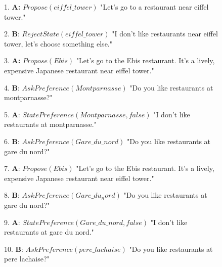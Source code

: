 	\begin{figure}[!t]
	\begin{minipage}{\textwidth}
			{\ttfamily
				\begin{addmargin}[1em]{2em}%
					\vspace{0.5 em}
					1. \textbf{A:} $Propose(eiffel\_tower)$ "Let's go to a restaurant \hspace*{3mm} near eiffel tower."
					
					
					2. \hspace*{3mm}\textbf{B}: $RejectState(eiffel\_tower)$ "I don't like \hspace*{4mm} restaurants near eiffel tower, let's choose \hspace*{4mm} something else."
					
					
					3. \textbf{A:} $Propose(Ebis)$ "Let's go to the Ebis restaurant. \hspace*{3mm} It's  a lively, expensive Japanese restaurant near \hspace*{3mm} eiffel tower."
					
					
					4. \hspace*{3mm}\textbf{B}: $AskPreference(Montparnasse)$ "Do you like \hspace*{4mm} restaurants at montparnasse?"
					
					
					5. \textbf{A}: $StatePreference(Montparnasse,false)$ "I don't like \hspace*{3mm} restaurants at montparnasse."
					
					
					6. \hspace*{3mm}\textbf{B}: $AskPreference(Gare\_du\_nord)$ "Do you like \hspace*{4mm} restaurants at gare du nord?"
					
					
					7. \textbf{A}: $Propose(Ebis)$ "Let's go to the Ebis  restaurant. \hspace*{3mm} It's a lively, expensive Japanese   restaurant near \hspace*{3mm} eiffel tower."
					
					
					8. \hspace*{3mm}\textbf{B}: $AskPreference(Gare\_du_nord)$ "Do you like \hspace*{4mm} restaurants at gare du nord?"
					
					
					9. \textbf{A}: $StatePreference(Gare\_du\_nord,false)$ "I don't like \hspace*{3mm} restaurants at gare du nord."
					
					
					10. \hspace*{3mm}\textbf{B}: $AskPreference(pere\_lachaise)$ "Do you like \hspace*{4mm} restaurants at pere lachaise?"
					

\end{addmargin}}
\end{minipage}
\end{figure}
